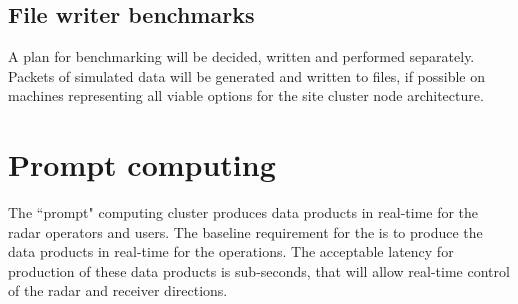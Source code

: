 \documentclass[12pt,a4paper]{article}
\begin{document}
 \subsection{File writer benchmarks}

A plan for benchmarking will be decided, written and performed separately. 
Packets of simulated \fsru data will be generated and written to files, if possible on machines representing all viable options for the site cluster node architecture. 


\section{Prompt computing}


The ``prompt" computing cluster produces data products in real-time for the radar operators and users.
The baseline requirement for the \pc is to produce the data products in real-time for the \NBW operations.
The acceptable latency for production of these data products is sub-seconds, that will allow real-time control of the radar and receiver directions. 
\end{document}
